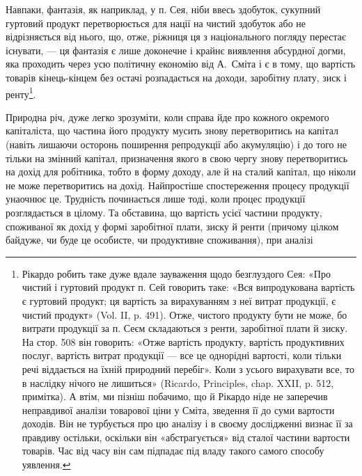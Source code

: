 Навпаки, фантазія, як наприклад, у п. Сея, ніби ввесь здобуток, сукупний
гуртовий продукт перетворюється для нації на чистий здобуток або не відрізняється
від нього, що, отже, ріжниця ця з національного погляду перестає існувати,
— ця фантазія є лише доконечне і крайнє виявлення абсурдної догми, яка
проходить через усю політичну економію від А.~Сміта і є в тому, що вартість
товарів кінець-кінцем без остачі розпадається на доходи, заробітну плату,
зиск і ренту\footnote{
Рікардо робить таке дуже вдале зауваження щодо безглуздого Сея: «Про чистий і гуртовий продукт
п. Сей говорить таке: «Вся випродукована вартість є гуртовий продукт; ця вартість за вирахуванням з
неї витрат продукції, є чистий продукт» (Vol. II, p. 491). Отже, чистого продукту бути не може, бо
витрати продукції за п. Сеєм складаються з ренти, заробітної плати й зиску. На стор. 508 він
говорить: «Отже вартість продукту, вартість продуктивних послуг, вартість витрат продукції — все
це однорідні вартості, коли тільки речі віддається на їхній природний перебіг». Коли з усього
вирахувати все, то в наслідку нічого не лишиться» (Ricardo, Principles, chap. XXII, p. 512,
примітка). А втім, ми пізніш побачимо, що й Рікардо ніде не заперечив неправдивої аналізи товарової
ціни у Сміта, зведення її до суми вартости доходів. Він не турбується про цю аналізу і в своєму
дослідженні визнає її за правдиву остільки, оскільки він «абстрагується» від сталої частини вартости
товарів. Час від часу він сам підпадає під владу такого самого способу уявлення.
}.

Природна річ, дуже легко зрозуміти, коли справа йде про кожного окремого
капіталіста, що частина його продукту мусить знову перетворитись на
капітал (навіть лишаючи осторонь поширення репродукції або акумуляцію) і до
того не тільки на змінний капітал, призначення якого в свою чергу знову перетворитись
на дохід для робітника, тобто в форму доходу, але й на сталий
капітал, що ніколи не може перетворитись на дохід. Найпростіше спостереження
процесу продукції унаочнює це. Трудність починається лише тоді, коли процес
продукції розглядається в цілому. Та обставина, що вартість усієї частини продукту,
споживаної як дохід у формі заробітної плати, зиску й ренти (причому
цілком байдуже, чи буде це особисте, чи продуктивне споживання), при аналізі
\parbreak{}  %
